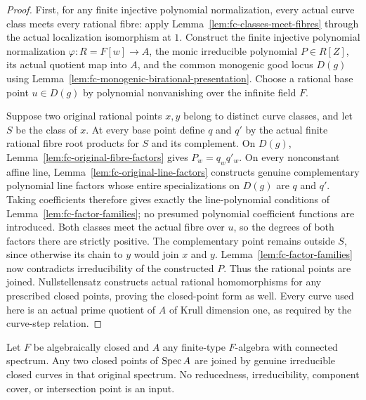 \begin{proof}
First, for any finite injective polynomial normalization, every actual curve class meets every rational
fibre: apply Lemma~\ref{lem:fc-classes-meet-fibres} through the actual localization isomorphism at $1$.
Construct the finite injective polynomial normalization $\varphi\colon R=F[w]\to A$, the monic
irreducible polynomial $P\in R[Z]$, its actual quotient map into $A$, and the common monogenic good
locus $D(g)$ using Lemma~\ref{lem:fc-monogenic-birational-presentation}. Choose a rational base point
$u\in D(g)$ by polynomial nonvanishing over the infinite field $F$.

Suppose two original rational points $x,y$ belong to distinct curve classes, and let $S$ be the class of $x$.
At every base point define $q$ and $q'$ by the actual finite rational fibre root products for $S$ and
its complement. On $D(g)$, Lemma~\ref{lem:fc-original-fibre-factors} gives $P_w=q_wq'_w$.
On every nonconstant affine line, Lemma~\ref{lem:fc-original-line-factors} constructs genuine
complementary polynomial line factors whose entire specializations on $D(g)$ are $q$ and $q'$.
Taking coefficients therefore gives exactly the line-polynomial conditions of
Lemma~\ref{lem:fc-factor-families}; no presumed polynomial coefficient functions are introduced.
Both classes meet the actual fibre over $u$, so the degrees of both factors there are strictly positive.
The complementary point remains outside $S$, since otherwise its chain to $y$ would join $x$ and $y$.
Lemma~\ref{lem:fc-factor-families} now contradicts irreducibility of the constructed $P$.
Thus the rational points are joined. Nullstellensatz constructs actual rational homomorphisms for
any prescribed closed points, proving the closed-point form as well. Every curve used here is an
actual prime quotient of $A$ of Krull dimension one, as required by the curve-step relation.
\end{proof}

\begin{lemma}\label{lem:fc-connected-affine-curve-chains}
\leanok
{}
Let $F$ be algebraically closed and $A$ any finite-type $F$-algebra with connected spectrum.
Any two closed points of $\operatorname{Spec} A$ are joined by genuine irreducible closed curves in that original spectrum.
No reducedness, irreducibility, component cover, or intersection point is an input.
\end{lemma}

